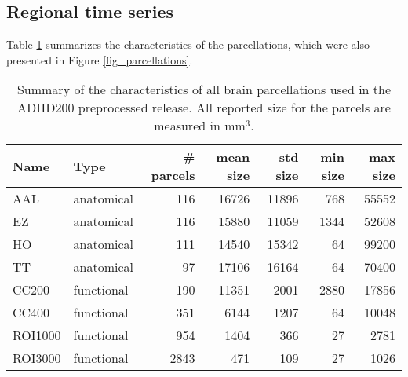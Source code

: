 \documentclass[preprint,12pt,3p]{elsarticle}
\begin{document}
\subsection{Regional time series}
Table \ref{tab_parcellations} summarizes the characteristics of the parcellations, which were also presented in Figure \ref{fig_parcellations}. 
\begin{table}[htbp]
\label{tab_parcellations}
\caption{Summary of the characteristics of all brain parcellations used in the ADHD200 preprocessed release. All reported size for the parcels are measured in mm$^3$.}
\begin{tabular}{llrrrrr}
Name & Type & \# parcels & mean size & std size & min size & max size \\
\hline
AAL	    & anatomical &  116 &  16726 & 11896 &  768 & 55552\\
EZ	    & anatomical &  116 &  15880 & 11059 & 1344 & 52608\\
HO	    & anatomical &  111 &  14540 & 15342 &   64 & 99200\\
TT	    & anatomical & 	 97 &  17106 & 16164 &   64 & 70400\\
CC200   & functional &  190 &  11351 &  2001 & 2880 & 17856\\
CC400   & functional &  351 &   6144 &  1207 &   64 & 10048\\
ROI1000 & functional &  954 &   1404 &   366 &   27 & 2781\\
ROI3000	& functional & 2843	&    471 &   109 &   27 & 1026\\
\end{tabular}
\end{table}

\end{document}
